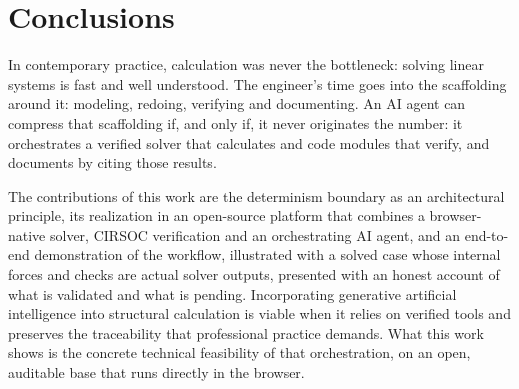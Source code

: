 \documentclass[11pt,a4paper]{article}
\begin{document}
\section{Conclusions}\label{sec:9}

In contemporary practice, calculation was never the bottleneck: solving linear systems is fast and well understood. The engineer's time goes into the scaffolding around it: modeling, redoing, verifying and documenting. An AI agent can compress that scaffolding if, and only if, it never originates the number: it orchestrates a verified solver that calculates and code modules that verify, and documents by citing those results.

The contributions of this work are the determinism boundary as an architectural principle, its realization in an open-source platform that combines a browser-native solver, CIRSOC verification and an orchestrating AI agent, and an end-to-end demonstration of the workflow, illustrated with a solved case whose internal forces and checks are actual solver outputs, presented with an honest account of what is validated and what is pending. Incorporating generative artificial intelligence into structural calculation is viable when it relies on verified tools and preserves the traceability that professional practice demands. What this work shows is the concrete technical feasibility of that orchestration, on an open, auditable base that runs directly in the browser.
\end{document}
